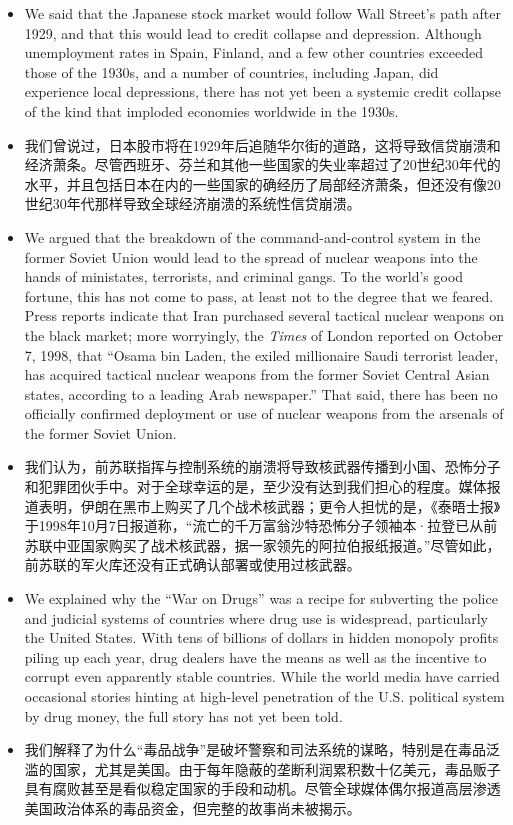 \begin{itemize}
\item We said that the Japanese stock market would follow Wall Street's path after 1929, and that this would lead to credit collapse and depression. Although unemployment rates in Spain, Finland, and a few other countries exceeded those of the 1930s, and a number of countries, including Japan, did experience local depressions, there has not yet been a systemic credit collapse of the kind that imploded economies worldwide in the 1930s. 
\item \small 我们曾说过，日本股市将在1929年后追随华尔街的道路，这将导致信贷崩溃和经济萧条。尽管西班牙、芬兰和其他一些国家的失业率超过了20世纪30年代的水平，并且包括日本在内的一些国家的确经历了局部经济萧条，但还没有像20世纪30年代那样导致全球经济崩溃的系统性信贷崩溃。
\end{itemize}


\begin{itemize}
\item We argued that the breakdown of the command-and-control system in the former Soviet Union would lead to the spread of nuclear weapons into the hands of ministates, terrorists, and criminal gangs. To the world's good fortune, this has not come to pass, at least not to the degree that we feared. Press reports indicate that Iran purchased several tactical nuclear weapons on the black market; more worryingly, the \emph{Times} of London reported on October 7, 1998, that “Osama bin Laden, the exiled millionaire Saudi terrorist leader, has acquired tactical nuclear weapons from the former Soviet Central Asian states, according to a leading Arab newspaper.” That said, there has been no officially confirmed deployment or use of nuclear weapons from the arsenals of the former Soviet Union.   
\item \small 我们认为，前苏联指挥与控制系统的崩溃将导致核武器传播到小国、恐怖分子和犯罪团伙手中。对于全球幸运的是，至少没有达到我们担心的程度。媒体报道表明，伊朗在黑市上购买了几个战术核武器；更令人担忧的是，《泰晤士报》于1998年10月7日报道称，“流亡的千万富翁沙特恐怖分子领袖本·拉登已从前苏联中亚国家购买了战术核武器，据一家领先的阿拉伯报纸报道。”尽管如此，前苏联的军火库还没有正式确认部署或使用过核武器。
\end{itemize}


\begin{itemize}
\item We explained why the “War on Drugs” was a recipe for subverting the police and judicial systems of countries where drug use is widespread, particularly the United States. With tens of billions of dollars in hidden monopoly profits piling up each year, drug dealers have the means as well as the incentive to corrupt even apparently stable countries. While the world media have carried occasional stories hinting at high-level penetration of the U.S. political system by drug money, the full story has not yet been told.  
\item \small 我们解释了为什么“毒品战争”是破坏警察和司法系统的谋略，特别是在毒品泛滥的国家，尤其是美国。由于每年隐蔽的垄断利润累积数十亿美元，毒品贩子具有腐败甚至是看似稳定国家的手段和动机。尽管全球媒体偶尔报道高层渗透美国政治体系的毒品资金，但完整的故事尚未被揭示。
\end{itemize}


